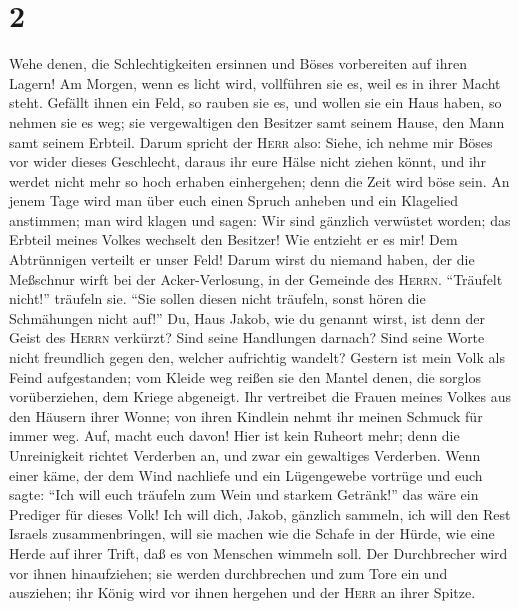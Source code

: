 \hypertarget{section-1}{%
\section{2}\label{section-1}}

 Wehe denen, die Schlechtigkeiten ersinnen und Böses
vorbereiten auf ihren Lagern! Am Morgen, wenn es licht wird, vollführen
sie es, weil es in ihrer Macht steht.  Gefällt ihnen ein
Feld, so rauben sie es, und wollen sie ein Haus haben, so nehmen sie es
weg; sie vergewaltigen den Besitzer samt seinem Hause, den Mann samt
seinem Erbteil.  Darum spricht der \textsc{Herr} also:
Siehe, ich nehme mir Böses vor wider dieses Geschlecht, daraus ihr eure
Hälse nicht ziehen könnt, und ihr werdet nicht mehr so hoch erhaben
einhergehen; denn die Zeit wird böse sein.  An jenem Tage
wird man über euch einen Spruch anheben und ein Klagelied anstimmen; man
wird klagen und sagen: Wir sind gänzlich verwüstet worden; das Erbteil
meines Volkes wechselt den Besitzer! Wie entzieht er es mir! Dem
Abtrünnigen verteilt er unser Feld!  Darum wirst du
niemand haben, der die Meßschnur wirft bei der Acker-Verlosung, in der
Gemeinde des \textsc{Herrn}.  ``Träufelt nicht!'' träufeln
sie. ``Sie sollen diesen nicht träufeln, sonst hören die Schmähungen
nicht auf!''  Du, Haus Jakob, wie du genannt wirst, ist
denn der Geist des \textsc{Herrn} verkürzt? Sind seine Handlungen
darnach? Sind seine Worte nicht freundlich gegen den, welcher aufrichtig
wandelt?  Gestern ist mein Volk als Feind aufgestanden;
vom Kleide weg reißen sie den Mantel denen, die sorglos vorüberziehen,
dem Kriege abgeneigt.  Ihr vertreibet die Frauen meines
Volkes aus den Häusern ihrer Wonne; von ihren Kindlein nehmt ihr meinen
Schmuck für immer weg.  Auf, macht euch davon! Hier ist
kein Ruheort mehr; denn die Unreinigkeit richtet Verderben an, und zwar
ein gewaltiges Verderben.  Wenn einer käme, der dem Wind
nachliefe und ein Lügengewebe vortrüge und euch sagte: ``Ich will euch
träufeln zum Wein und starkem Getränk!'' das wäre ein Prediger für
dieses Volk!  Ich will dich, Jakob, gänzlich sammeln, ich
will den Rest Israels zusammenbringen, will sie machen wie die Schafe in
der Hürde, wie eine Herde auf ihrer Trift, daß es von Menschen wimmeln
soll.  Der Durchbrecher wird vor ihnen hinaufziehen; sie
werden durchbrechen und zum Tore ein und ausziehen; ihr König wird vor
ihnen hergehen und der \textsc{Herr} an ihrer Spitze.

